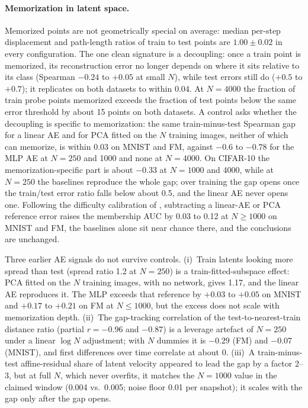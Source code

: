 \documentclass[10pt]{article}
\begin{document}
\paragraph{Memorization in latent space.} Memorized points are not geometrically special on average: median per-step displacement and path-length ratios of train to test points are $1.00\pm0.02$ in every configuration. The one clean signature is a decoupling: once a train point is memorized, its reconstruction error no longer depends on where it sits relative to its class (Spearman $-0.24$ to $+0.05$ at small $N$), while test errors still do ($+0.5$ to $+0.7$); it replicates on both datasets to within 0.04. At $N=4000$ the fraction of train probe points memorized exceeds the fraction of test points below the same error threshold by about 15 points on both datasets. A control asks whether the decoupling is specific to memorization: the same train-minus-test Spearman gap for a linear AE and for PCA fitted on the $N$ training images, neither of which can memorize, is within 0.03 on MNIST and FM, against $-0.6$ to $-0.78$ for the MLP AE at $N=250$ and 1000 and none at $N=4000$. On CIFAR-10 the memorization-specific part is about $-0.33$ at $N=1000$ and 4000, while at $N=250$ the baselines reproduce the whole gap; over training the gap opens once the train/test error ratio falls below about 0.5, and the linear AE never opens one. Following the difficulty calibration of \citet{shafran2021membership}, subtracting a linear-AE or PCA reference error raises the membership AUC by 0.03 to 0.12 at $N\ge1000$ on MNIST and FM, the baselines alone sit near chance there, and the conclusions are unchanged.

Three earlier AE signals do not survive controls. (i)~Train latents looking more spread than test (spread ratio 1.2 at $N=250$) is a train-fitted-subspace effect: PCA fitted on the $N$ training images, with no network, gives 1.17, and the linear AE reproduces it. The MLP exceeds that reference by $+0.03$ to $+0.05$ on MNIST and $+0.17$ to $+0.21$ on FM at $N\le1000$, but the excess does not scale with memorization depth. (ii)~The gap-tracking correlation of the test-to-nearest-train distance ratio (partial $r=-0.96$ and $-0.87$) is a leverage artefact of $N=250$ under a linear $\log N$ adjustment; with $N$ dummies it is $-0.29$ (FM) and $-0.07$ (MNIST), and first differences over time correlate at about 0. (iii)~A train-minus-test affine-residual share of latent velocity appeared to lead the gap by a factor 2--3, but at full $N$, which never overfits, it matches the $N=1000$ value in the claimed window (0.004 vs.\ 0.005; noise floor 0.01 per snapshot); it scales with the gap only after the gap opens.
\end{document}
